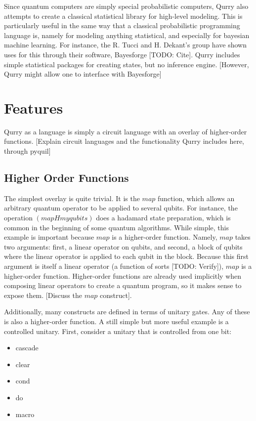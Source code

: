 \documentclass[journal]{article}
\begin{document}
Since quantum computers are simply special probabilistic computers, Qurry also attempts to create a classical statistical library for high-level modeling. 
This is particularly useful in the same way that a classical probabilistic programming language is, namely for modeling anything statistical, and especially for bayesian machine learning.
For instance, the R. Tucci and H. Dekant's group have shown uses for this through their software, Bayesforge [TODO: Cite].
Qurry includes simple statistical packages for creating states, but no inference engine.
[However, Qurry might allow one to interface with Bayesforge]

\section{Features}

    Qurry as a language is simply a circuit language with an overlay of higher-order functions.
    [Explain circuit languages and the functionality Qurry includes here, through pyquil]

    \subsection{Higher Order Functions}

    The simplest overlay is quite trivial. It is the $map$ function, which allows an arbitrary quantum operator to be applied to several qubits. 
    For instance, the operation $(map H myqubits)$ does a hadamard state preparation, which is common in the beginning of some quantum algorithms.
    While simple, this example is important because $map$ is a higher-order function.
    Namely, $map$ takes two arguments: first, a linear operator on qubits, and second, a block of qubits where the linear operator is applied to each qubit in the block.
    Because this first argument is itself a linear operator (a function of sorts [TODO: Verify]), $map$ is a higher-order function.
    Higher-order functions are already used implicitly when composing linear operators to create a quantum program, so it makes sense to expose them.
    [Discuss the $map$ construct].

    Additionally, many constructs are defined in terms of unitary gates. Any of these is also a higher-order function.
    A still simple but more useful example is a controlled unitary.
    First, consider a unitary that is controlled from one bit:


    \begin{itemize}
        \item cascade 	    
        \item clear 	    
        \item cond 	    
        \item do 	        
        \item macro 	    
    \end{itemize}
\end{document}
